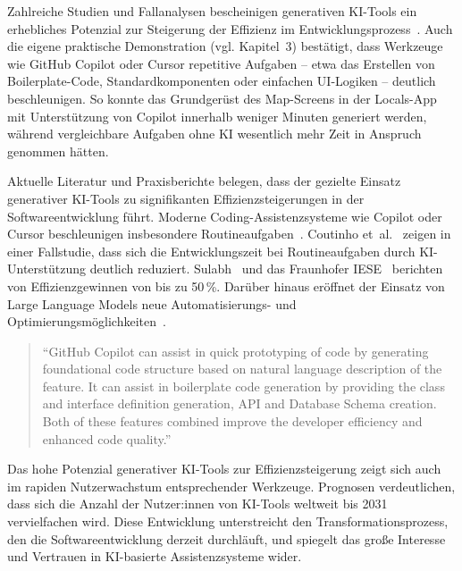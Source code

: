 Zahlreiche Studien und Fallanalysen bescheinigen generativen KI-Tools ein
erhebliches Potenzial zur Steigerung der Effizienz im
Entwicklungsprozess~\cite{donvir_role_2024,coutinho_role_2024,s_future_2024,esposito_generative_2025,braun_ki_2024,siebert_generative_2024}.
Auch die eigene praktische Demonstration (vgl. Kapitel~3) bestätigt, dass
Werkzeuge wie GitHub Copilot oder Cursor repetitive Aufgaben – etwa das
Erstellen von Boilerplate-Code, Standardkomponenten oder einfachen UI-Logiken –
deutlich beschleunigen. So konnte das Grundgerüst des Map-Screens in der
Locals-App mit Unterstützung von Copilot innerhalb weniger Minuten generiert
werden, während vergleichbare Aufgaben ohne KI wesentlich mehr Zeit in Anspruch
genommen hätten.

Aktuelle Literatur und Praxisberichte belegen, dass der gezielte Einsatz
generativer KI-Tools zu signifikanten Effizienzsteigerungen in der
Softwareentwicklung führt. Moderne Coding-Assistenzsysteme wie Copilot oder
Cursor beschleunigen insbesondere Routineaufgaben~\cite{donvir_role_2024}.
Coutinho et~al.~\cite{coutinho_role_2024} zeigen in einer Fallstudie, dass sich
die Entwicklungszeit bei Routineaufgaben durch KI-Unterstützung deutlich
reduziert. Sulabh~\cite{s_future_2024} und das Fraunhofer
IESE~\cite{siebert_generative_2024} berichten von Effizienzgewinnen von bis zu
50\,\%. Darüber hinaus eröffnet der Einsatz von Large Language Models neue
Automatisierungs- und
Optimierungsmöglichkeiten~\cite{esposito_generative_2025}.

\begin{quote}
    \enquote{GitHub Copilot can assist in quick prototyping of code by generating foundational code structure based on natural language description of the feature. It can assist in boilerplate code generation by providing the class and interface definition generation, API and Database Schema creation. Both of these features combined improve the developer efficiency and enhanced code quality.}
    \cite[S.~4]{donvir_role_2024}
\end{quote}

Das hohe Potenzial generativer KI-Tools zur Effizienzsteigerung zeigt sich auch
im rapiden Nutzerwachstum entsprechender Werkzeuge. Prognosen verdeutlichen,
dass sich die Anzahl der Nutzer:innen von KI-Tools weltweit bis 2031
vervielfachen wird. Diese Entwicklung unterstreicht den Transformationsprozess,
den die Softwareentwicklung derzeit durchläuft, und spiegelt das große
Interesse und Vertrauen in KI-basierte Assistenzsysteme wider.

